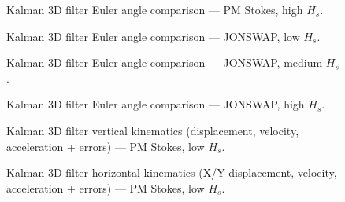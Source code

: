 \documentclass[11pt,letterpaper]{article}
\begin{document}
\begin{figure}[H]\centering
  \resizebox{\textwidth}{!}{}
  \caption{Kalman 3D filter Euler angle comparison — PM Stokes, high $H_s$.}
  \label{fig:w3d_pmstokes_high}
\end{figure}

\begin{figure}[H]\centering
  \resizebox{\textwidth}{!}{}
  \caption{Kalman 3D filter Euler angle comparison — JONSWAP, low $H_s$.}
  \label{fig:w3d_jonswap_low}
\end{figure}

\begin{figure}[H]\centering
  \resizebox{\textwidth}{!}{}
  \caption{Kalman 3D filter Euler angle comparison — JONSWAP, medium $H_s$.}
  \label{fig:w3d_jonswap_medium}
\end{figure}

\begin{figure}[H]\centering
  \resizebox{\textwidth}{!}{}
  \caption{Kalman 3D filter Euler angle comparison — JONSWAP, high $H_s$.}
  \label{fig:w3d_jonswap_high}
\end{figure}



\begin{figure}[H]\centering
  \resizebox{\textwidth}{!}{}
  \caption{Kalman 3D filter vertical kinematics (displacement, velocity, acceleration + errors) — PM Stokes, low $H_s$.}
  \label{fig:w3d_pmstokes_low_zkin}
\end{figure}

\begin{figure}[H]\centering
  \resizebox{\textwidth}{!}{}
  \caption{Kalman 3D filter horizontal kinematics (X/Y displacement, velocity, acceleration + errors) — PM Stokes, low $H_s$.}
  \label{fig:w3d_pmstokes_low_xykin}
\end{figure}
\end{document}
